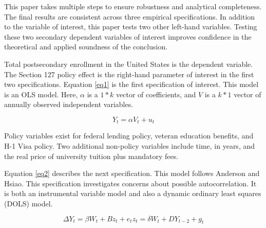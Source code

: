 \documentclass[review]{elsarticle}
\begin{document}
This paper takes multiple steps to ensure robustness and analytical completeness.
The final results are consistent across three empirical specifications.
In addition to the variable of interest, this paper tests two other left-hand variables.
Testing these two secondary dependent variables of interest improves confidence in the theoretical and applied soundness of the conclusion.

Total postsecondary enrollment in the United States is the dependent variable.
The Section 127 policy effect is the right-hand parameter of interest in the first two specifications.
Equation \ref{eq1} is the first specification of interest.
This model is an OLS model.
Here, $\alpha$ is a $1*k$ vector of coefficients,
and $V$ is a $k*1$ vector of annually observed independent variables.

\begin{equation}
    Y_t = \alpha{V_{t}}+u_t
    \label{eq1}
\end{equation}

Policy variables exist for federal lending policy, veteran education benefits, and H-1 Visa policy.
Two additional non-policy variables include time, in years,
and the real price of university tuition plus mandatory fees.

Equation \ref{eq2} describes the next specification.
This model follows Anderson and Hsiao\cite{anderson1981estimation}.
This specification investigates concerns about possible autocorrelation.
It is both an instrumental variable model and also a dynamic ordinary least squares (DOLS) model.

\begin{subequations}
    \begin{equation}
        \Delta{Y_t} = \beta{W_{t}}+B{z_t}+e_t
        \label{eq2}
    \end{equation}
    \begin{equation}
        z_t = \delta{W_{t}}+D{Y_{t-2}}+g_t
        \label{eq3}
    \end{equation}
\end{subequations}
\end{document}

